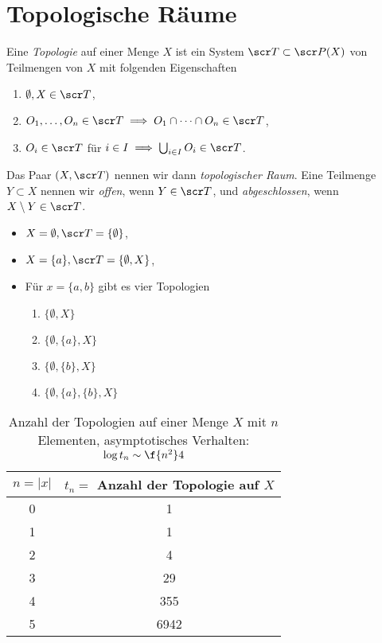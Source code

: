
\chapter{Topologische Räume}


\begin{df}
	Eine \emph{Topologie} auf einer Menge $X$ ist ein System $\scr T \subset \scr P(X)$ von Teilmengen von $X$ mit folgenden Eigenschaften
	\begin{enumerate}[O1)]
		\item
			$\emptyset, X \in \scr T$,
		\item
			$O_1, \dotsc, O_n \in \scr T \implies O_1 \cap \dotsb \cap O_n \in \scr T$,
		\item
			$O_i \in \scr T$ für $i \in I \implies \bigcup_{i\in I} O_i \in \scr T$.
	\end{enumerate}
	Das Paar $(X, \scr T)$ nennen wir dann \emph{topologischer Raum}.
	Eine Teilmenge $Y \subset X$ nennen wir \emph{offen}, wenn $Y \in \scr T$, und \emph{abgeschlossen}, wenn $X \setminus Y \in \scr T$.
\end{df}

\begin{ex}
	\begin{itemize}
		\item
			$X = \emptyset, \scr T = \{\emptyset\}$,
		\item
			$X = \{a\}, \scr T = \{ \emptyset, X \}$,
		\item
			Für $x = \{a,b\}$ gibt es vier Topologien
			\begin{enumerate}[1.]
				\item
					$\{\emptyset, X\}$
				\item
					$\{\emptyset, \{a\}, X\}$
				\item
					$\{\emptyset, \{b\}, X \}$
				\item
					$\{\emptyset, \{a\}, \{b\}, X\}$
			\end{enumerate}
	\end{itemize}
	\begin{table}[H]
		\centering
		\caption{Anzahl der Topologien auf einer Menge $X$ mit $n$ Elementen, asymptotisches Verhalten: $\log t_n \sim \f {n^2}4$}
		\begin{tabular}{c|c}
			$n=|x|$ & $t_n = $ Anzahl der Topologie auf $X$ \\ \hline
			0 & 1 \\
			1 & 1 \\
			2 & 4 \\
			3 & 29 \\
			4 & 355 \\
			5 & 6942
		\end{tabular}
	\end{table}
\end{ex}

